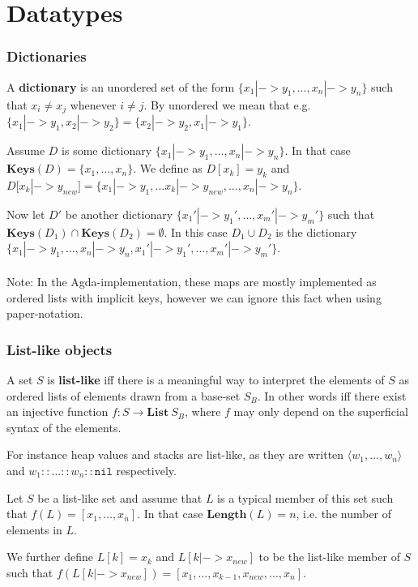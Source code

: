 \section{Datatypes}

\subsubsection{Dictionaries}
A \textbf{dictionary} is an unordered set of the form
$\{x_1 |-> y_1, \dots, x_n |-> y_n\}$ such that $x_i \neq x_j$ whenever
$i \neq j$. By unordered we mean that e.g.
$\{x_1 |-> y_1, x_2 |-> y_2\} = \{x_2 |-> y_2, x_1 |-> y_1\}$.

Assume $D$ is some dictionary $\{x_1 |-> y_1, \dots, x_n |-> y_n\}$. In that
case $\mathbf{Keys}(D) = \{x_1, \dots, x_n\}$. We define as $D[x_k] = y_k$ and
$D[x_k |-> y_{new}] = \{x_1 |-> y_1, \dots x_k |-> y_{new}, \dots, x_n |->
y_n\}$.

Now let $D'$ be another dictionary $\{x_1' |-> y_1', \dots, x_m' |-> y_m'\}$
such that $\mathbf{Keys}(D_1) \cap \mathbf{Keys}(D_2) = \emptyset$. In this case
$D_1 \cup D_2$ is the dictionary
$\{x_1 |-> y_1, \dots, x_n |-> y_n, x_1' |-> y_1', \dots, x_m' |-> y_m'\}$.

\paragraph{}
Note: In the Agda-implementation, these maps are mostly implemented as ordered
lists with implicit keys, however we can ignore this fact when using
paper-notation.

\subsubsection{List-like objects}
A set $S$ is \textbf{list-like} iff there is a meaningful way to interpret the
elements of $S$ as ordered lists of elements drawn from a base-set $S_B$. In
other words iff there exist an injective function
$f : S \to \mathbf{List}\ S_B$, where $f$ may only depend on the superficial
syntax of the elements.

For instance heap values and stacks are list-like, as they are written
$\langle w_1, \dots, w_n \rangle$ and $w_1 :: \dots :: w_n :: \mathtt{nil}$
respectively.

Let $S$ be a list-like set and assume that $L$ is a typical member of this set
such that $f(L) = [x_1, \dots, x_n]$. In that case $\mathbf{Length}(L) = n$,
i.e. the number of elements in $L$.

We further define $L[k] = x_k$ and $L[k |-> x_{new}]$ to be the list-like member
of $S$ such that
$f(L[k |-> x_{new}]) = [x_1, \dots, x_{k-1}, x_{new}, \dots, x_n]$.
